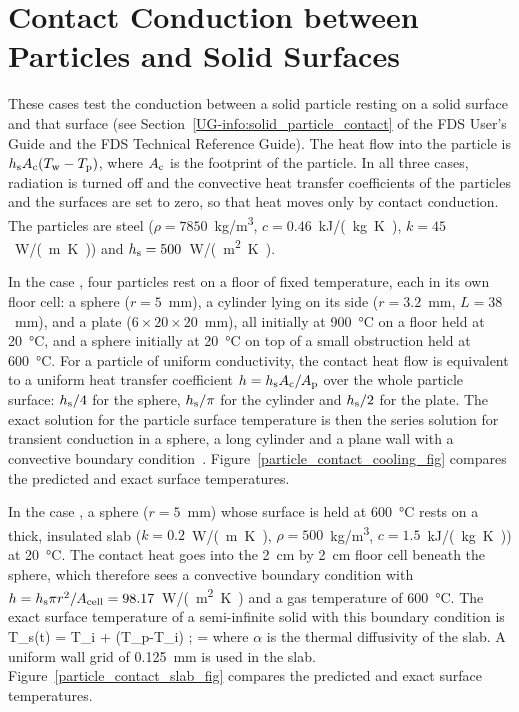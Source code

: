 \documentclass[11pt]{book}
\begin{document}
\section{Contact Conduction between Particles and Solid Surfaces}
\label{particle_contact}

These cases test the conduction between a solid particle resting on a solid surface and that surface (see Section~\ref{UG-info:solid_particle_contact} of the FDS User's Guide and the FDS Technical Reference Guide). The heat flow into the particle is $h_{\rm s} A_{\rm c} (T_{\rm w}-T_{\rm p})$, where $A_{\rm c}$ is the footprint of the particle. In all three cases, radiation is turned off and the convective heat transfer coefficients of the particles and the surfaces are set to zero, so that heat moves only by contact conduction. The particles are steel ($\rho=7850$~\unit{kg/m^3}, $c=0.46$~\unit{kJ/(kg.K)}, $k=45$~\unit{W/(m.K)}) and $h_{\rm s}=500$~\unit{W/(m^2.K)}.

In the case , four particles rest on a floor of fixed temperature, each in its own floor cell: a sphere ($r=5$~mm), a cylinder lying on its side ($r=3.2$~mm, $L=38$~mm), and a plate ($6 \times 20 \times 20$~mm), all initially at 900~\unit{\degreeCelsius} on a floor held at 20~\unit{\degreeCelsius}, and a sphere initially at 20~\unit{\degreeCelsius} on top of a small obstruction held at 600~\unit{\degreeCelsius}. For a particle of uniform conductivity, the contact heat flow is equivalent to a uniform heat transfer coefficient $h = h_{\rm s} A_{\rm c}/A_{\rm p}$ over the whole particle surface: $h_{\rm s}/4$ for the sphere, $h_{\rm s}/\pi$ for the cylinder and $h_{\rm s}/2$ for the plate. The exact solution for the particle surface temperature is then the series solution for transient conduction in a sphere, a long cylinder and a plane wall with a convective boundary condition~\cite{Incropera:1}. Figure~\ref{particle_contact_cooling_fig} compares the predicted and exact surface temperatures.

In the case , a sphere ($r=5$~mm) whose surface is held at 600~\unit{\degreeCelsius} rests on a thick, insulated slab ($k=0.2$~\unit{W/(m.K)}, $\rho=500$~\unit{kg/m^3}, $c=1.5$~\unit{kJ/(kg.K)}) at 20~\unit{\degreeCelsius}. The contact heat goes into the 2~cm by 2~cm floor cell beneath the sphere, which therefore sees a convective boundary condition with $h = h_{\rm s} \pi r^2/A_{\rm cell} = 98.17$~\unit{W/(m^2.K)} and a gas temperature of 600~\unit{\degreeCelsius}. The exact surface temperature of a semi-infinite solid with this boundary condition is~\cite{Incropera:1}
\be
   T_{\rm s}(t) = T_{\rm i} + (T_{\rm p}-T_{\rm i})  \quad ; \quad \beta = 
\ee
where $\alpha$ is the thermal diffusivity of the slab. A uniform wall grid of 0.125~mm is used in the slab. Figure~\ref{particle_contact_slab_fig} compares the predicted and exact surface temperatures.
\end{document}
